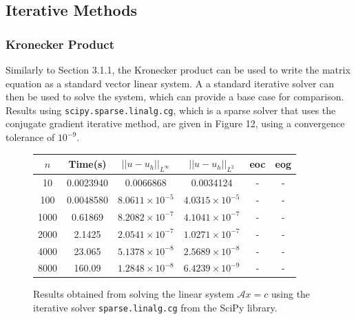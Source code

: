 \documentclass{article}
\numberwithin{equation}{section}
\begin{document}
\subsection{Iterative Methods}

\subsubsection{Kronecker Product}
Similarly to Section 3.1.1, the Kronecker product can be used to write the matrix equation as a standard vector linear system. A a standard iterative solver can then be used to solve the system, which can provide a base case for comparison. Results using \texttt{scipy.sparse.linalg.cg}, which is a sparse solver that uses the conjugate gradient iterative method, are given in Figure 12, using a convergence tolerance of $10^{-9}$.

\begin{figure}[H]
\centering
\begin{tabular}{|c|c|c|c|c|c|}
\hline
$n$ & Time(s) & $|| u - u_h ||_{L^{\infty}}$ &$|| u - u_h ||_{L^{2}}$ & eoc & eog \\
\hline
10 & 0.0023940 & 0.0066868 & 0.0034124 & -  & - \\
100 & 0.0048580 & $8.0611 \times 10^{-5}$ & $4.0315 \times 10^{-5}$ & -  & - \\
1000 & 0.61869 & $8.2082 \times 10^{-7}$ & $4.1041 \times 10^{-7}$ & - & -  \\
2000 & 2.1425 & $2.0541 \times 10^{-7}$ & $1.0271 \times 10^{-7}$ & - & -  \\
4000 & 23.065 & $5.1378 \times 10^{-8}$ & $2.5689 \times 10^{-8}$ & - & -  \\
8000 & 160.09 & $1.2848 \times 10^{-8}$ & $6.4239 \times 10^{-9}$ & - & -  \\
\hline
\end{tabular}
\captionsetup{justification=centering}
\caption{Results obtained from solving the linear system $\mathcal{A} x = c$ using the iterative solver  \texttt{sparse.linalg.cg} from the SciPy library.}
\end{figure}
\end{document}
